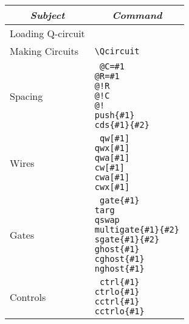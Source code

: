 \documentclass[twocolumn,nofootinbib]{revtex4}
\begin{document}
{\small \begin{center}
    \begin{tabular}{l | l } 
        \multicolumn{1}{c}{\itshape Subject} & \multicolumn{1}{c}{\itshape Command }\\ \hline 
        Loading Q-circuit \hspace{.5em} & \verb== \\
        Making Circuits & \verb=\Qcircuit= \\
        Spacing & \parbox[t]{6cm}{\tt
                    @C=\#1 \\
                    @R=\#1 \\
                    @!R \\
                    @!C \\
                    @! \\
                     push\{\#1\} \\
                     cds\{\#1\}\{\#2\}}\\
        Wires & \parbox[t]{6cm}{\tt
                     qw[\#1] \\
                     qwx[\#1] \\
                     qwa[\#1] \\
                     cw[\#1] \\
                     cwa[\#1] \\
                     cwx[\#1] }\\
        Gates & \parbox[t]{6cm}{\tt
                     gate\{\#1\} \\
                     targ \\
                     qswap \\
                     multigate\{\#1\}\{\#2\} \\
                     sgate\{\#1\}\{\#2\}\\
                     ghost\{\#1\} \\
                     cghost\{\#1\} \\
                     nghost\{\#1\} }\\
        Controls & \parbox[t]{6cm}{\tt
                     ctrl\{\#1\} \\
                     ctrlo\{\#1\} \\
                     cctrl\{\#1\} \\
                     cctrlo\{\#1\} \\
}
\end{tabular}
\end{center}}
\end{document}
